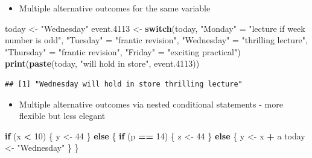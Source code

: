 \documentclass[ignorenonframetext,]{beamer}
\newenvironment{Shaded}{\begin{snugshade}}{\end{snugshade}}
\newcommand{\KeywordTok}[1]{\textcolor[rgb]{0.13,0.29,0.53}{\textbf{#1}}}
\newcommand{\DecValTok}[1]{\textcolor[rgb]{0.00,0.00,0.81}{#1}}
\newcommand{\StringTok}[1]{\textcolor[rgb]{0.31,0.60,0.02}{#1}}
\newcommand{\ControlFlowTok}[1]{\textcolor[rgb]{0.13,0.29,0.53}{\textbf{#1}}}
\newcommand{\OperatorTok}[1]{\textcolor[rgb]{0.81,0.36,0.00}{\textbf{#1}}}
\newcommand{\NormalTok}[1]{#1}
\providecommand{\tightlist}{%
  \setlength{\itemsep}{0pt}\setlength{\parskip}{0pt}}
\begin{document}
\begin{frame}[fragile]

\begin{itemize}[<+->]
\tightlist
\item
  Multiple alternative outcomes for the same variable
\end{itemize}

\begin{Shaded}
\begin{Highlighting}[]
\NormalTok{today <-}\StringTok{ "Wednesday"}
\NormalTok{event.}\DecValTok{4113}\NormalTok{ <-}\StringTok{ }\ControlFlowTok{switch}\NormalTok{(today,}
                \StringTok{"Monday"}\NormalTok{ =}\StringTok{ "lecture if week number is odd"}\NormalTok{,}
                \StringTok{"Tuesday"}\NormalTok{ =}\StringTok{ "frantic revision"}\NormalTok{,}
                \StringTok{"Wednesday"}\NormalTok{ =}\StringTok{ "thrilling lecture"}\NormalTok{,}
                \StringTok{"Thursday"}\NormalTok{ =}\StringTok{ "frantic revision"}\NormalTok{,}
                \StringTok{"Friday"}\NormalTok{ =}\StringTok{ "exciting practical"}\NormalTok{)}
\KeywordTok{print}\NormalTok{(}\KeywordTok{paste}\NormalTok{(today, }\StringTok{"will hold in store"}\NormalTok{, event.}\DecValTok{4113}\NormalTok{))}
\end{Highlighting}
\end{Shaded}

\begin{verbatim}
## [1] "Wednesday will hold in store thrilling lecture"
\end{verbatim}

\end{frame}

\begin{frame}[fragile]

\begin{itemize}[<+->]
\tightlist
\item
  Multiple alternative outcomes via nested conditional statements - more
  flexible but less elegant
\end{itemize}

\begin{Shaded}
\begin{Highlighting}[]
\ControlFlowTok{if}\NormalTok{ (x }\OperatorTok{<}\StringTok{ }\DecValTok{10}\NormalTok{) \{}
\NormalTok{  y <-}\StringTok{ }\DecValTok{44}
\NormalTok{\} }\ControlFlowTok{else}\NormalTok{ \{}
  \ControlFlowTok{if}\NormalTok{ (p }\OperatorTok{==}\StringTok{ }\DecValTok{14}\NormalTok{) \{}
\NormalTok{    z <-}\StringTok{ }\DecValTok{44}
\NormalTok{  \} }\ControlFlowTok{else}\NormalTok{ \{}
\NormalTok{    y <-}\StringTok{ }\NormalTok{x }\OperatorTok{+}\StringTok{ }\NormalTok{a}
\NormalTok{    today <-}\StringTok{ "Wednesday"}
\NormalTok{  \}}
\NormalTok{\}}
\end{Highlighting}
\end{Shaded}

\end{frame}
\end{document}
